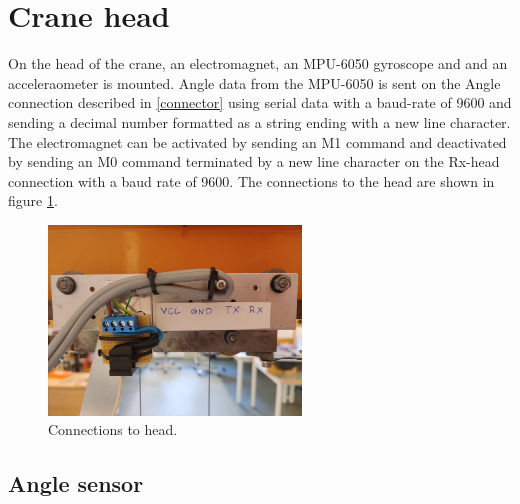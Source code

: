 \section{Crane head}
On the head of the crane, an electromagnet, an MPU-6050 gyroscope and and an acceleraometer is mounted. Angle data from the MPU-6050 is sent on the Angle connection described in \ref{connector} using serial data with a baud-rate of 9600 and sending a decimal number formatted as a string ending with a new line character. 
The electromagnet can be activated by sending an M1 command and deactivated by sending an M0 command terminated by a new line character on the Rx-head connection with a baud rate of 9600. The connections to the head are shown in figure \ref{fig:head}.

\begin{figure}[H]
    \centering
    \includegraphics[width=0.6\textwidth]{pictures/head.jpg}
    \caption{Connections to head.}
    \label{fig:head}
\end{figure}

\subsection{Angle sensor}\label{sec:angleSensor}




